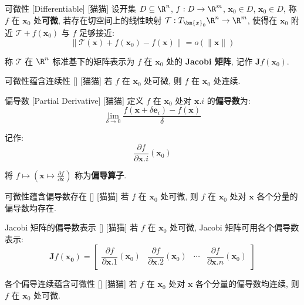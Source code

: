 \documentclass[UTF8]{ctexart}
\begin{document}
			\begin{dfn}
			    []
			    {可微性}
			    [Differentiable]
			    [猫猫]
				设开集 \(D\subseteq\R^n\), \(f:D\to\R^m\), \(\bm{x}_0\in D\), \(\bm{x}_0\in D\), 称 \(f\) 在 \(\bm{x}_0\) 处\textbf{可微}, 若存在切空间上的线性映射 \(\mathcal{T}:T_{\bm{x}_0}\R^n\to\R^m\), 使得在 \(\bm{x}_0\) 附近 \(\mathcal{T}+f(\bm{x}_0)\) 与 \(f\) 足够接近: 
				\[\|\mathcal{T}(\bm{x})+f(\bm{x}_0)-f(\bm{x})\|=o(\|\bm{x}\|)\]

				称 \(\mathcal{T}\) 在 \(\R^n\) 标准基下的矩阵表示为 \(f\) 在 \(\bm{x}_0\) 处的 \textbf{Jacobi 矩阵}, 记作 \(\bm{J}f(\bm{x}_0)\). 
			\end{dfn}
			
			\begin{ppt}
				[]
				{可微性蕴含连续性}
				[]
				[猫猫]
				若 \(f\) 在 \(\bm{x}_0\) 处可微, 则 \(f\) 在 \(\bm{x}_0\) 处连续. 
			\end{ppt}
			
			\begin{dfn}
			    []
			    {偏导数}
			    [Partial Derivative]
			    [猫猫]
				定义 \(f\) 在 \(\bm{x}_0\) 处对 \(\bm{x}.i\) 的\textbf{偏导数}为: 
				\[\lim_{\delta\to 0}\frac{f(\bm{x}+\delta\bm{e}_i)-f(\bm{x})}{\delta}\]

				记作: 
				\[\frac{\partial f}{\partial \bm{x}.i}(\bm{x}_0)\]

				将 \(f\mapsto (\bm{x}\mapsto\frac{\partial f}{\partial\bm{x}})\) 称为\textbf{偏导算子}. 
			\end{dfn}
			
			\begin{ppt}
				[]
				{可微性蕴含偏导数存在}
				[]
				[猫猫]
				若 \(f\) 在 \(\bm{x}_0\) 处可微, 则 \(f\) 在 \(\bm{x}_0\) 处对 \(\bm{x}\) 各个分量的偏导数均存在. 
			\end{ppt}
			
			\begin{ppt}
				[]
				{Jacobi 矩阵的偏导数表示}
				[]
				[猫猫]
				若 \(f\) 在 \(\bm{x}_0\) 处可微, Jacobi 矩阵可用各个偏导数表示: 
				\[\bm{J}f(\bm{x_0})=
				\begin{bmatrix}
					\dfrac{\partial f}{\partial \bm{x}.1}(\bm{x}_0) & \dfrac{\partial f}{\partial \bm{x}.2}(\bm{x}_0) & \cdots & \dfrac{\partial f}{\partial \bm{x}.n}(\bm{x}_0)\\
				\end{bmatrix}\]
			\end{ppt}
			
			\begin{thm}
				[]
				{各个偏导连续蕴含可微性}
				[]
				[猫猫]
				若 \(f\) 在 \(\bm{x}_0\) 处对 \(\bm{x}\) 各个分量的偏导数均连续, 则 \(f\) 在 \(\bm{x}_0\) 处可微. 
			\end{thm}
			
\end{document}

